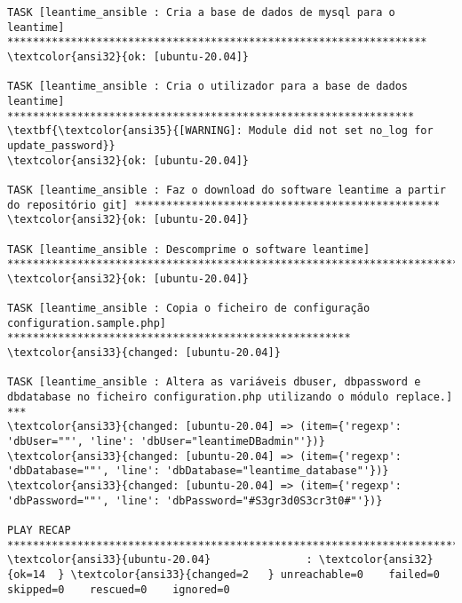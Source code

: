 \documentclass{scrartcl}
\begin{document}
\begin{Verbatim}
TASK [leantime_ansible : Cria a base de dados de mysql para o leantime] ******************************************************************
\textcolor{ansi32}{ok: [ubuntu-20.04]}

TASK [leantime_ansible : Cria o utilizador para a base de dados leantime] ****************************************************************
\textbf{\textcolor{ansi35}{[WARNING]: Module did not set no_log for update_password}}
\textcolor{ansi32}{ok: [ubuntu-20.04]}

TASK [leantime_ansible : Faz o download do software leantime a partir do repositório git] ************************************************
\textcolor{ansi32}{ok: [ubuntu-20.04]}

TASK [leantime_ansible : Descomprime o software leantime] ********************************************************************************
\textcolor{ansi32}{ok: [ubuntu-20.04]}

TASK [leantime_ansible : Copia o ficheiro de configuração configuration.sample.php] ******************************************************
\textcolor{ansi33}{changed: [ubuntu-20.04]}

TASK [leantime_ansible : Altera as variáveis dbuser, dbpassword e dbdatabase no ficheiro configuration.php utilizando o módulo replace.] ***
\textcolor{ansi33}{changed: [ubuntu-20.04] => (item={'regexp': 'dbUser=""', 'line': 'dbUser="leantimeDBadmin"'})}
\textcolor{ansi33}{changed: [ubuntu-20.04] => (item={'regexp': 'dbDatabase=""', 'line': 'dbDatabase="leantime_database"'})}
\textcolor{ansi33}{changed: [ubuntu-20.04] => (item={'regexp': 'dbPassword=""', 'line': 'dbPassword="#S3gr3d0S3cr3t0#"'})}

PLAY RECAP *******************************************************************************************************************************
\textcolor{ansi33}{ubuntu-20.04}               : \textcolor{ansi32}{ok=14  } \textcolor{ansi33}{changed=2   } unreachable=0    failed=0    skipped=0    rescued=0    ignored=0



\end{Verbatim}
\end{document}
